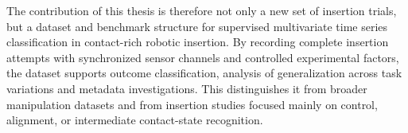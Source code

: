 The contribution of this thesis is therefore not only a new set of insertion trials, but a dataset and benchmark structure for supervised multivariate time series classification in contact-rich robotic insertion. By recording complete insertion attempts with synchronized sensor channels and controlled experimental factors, the dataset supports outcome classification, analysis of generalization across task variations and metadata investigations. This distinguishes it from broader manipulation datasets and from insertion studies focused mainly on control, alignment, or intermediate contact-state recognition.



